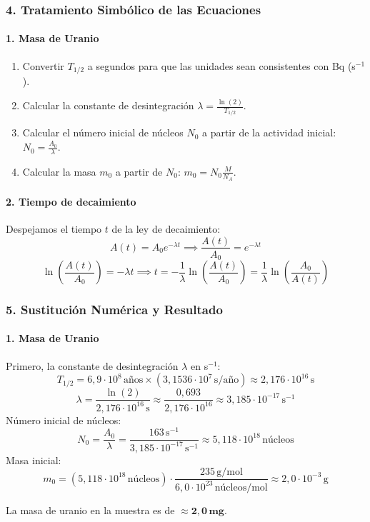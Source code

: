 \subsubsection*{4. Tratamiento Simbólico de las Ecuaciones}
\paragraph{1. Masa de Uranio}
\begin{enumerate}
    \item Convertir $T_{1/2}$ a segundos para que las unidades sean consistentes con Bq (s$^{-1}$).
    \item Calcular la constante de desintegración $\lambda = \frac{\ln(2)}{T_{1/2}}$.
    \item Calcular el número inicial de núcleos $N_0$ a partir de la actividad inicial: $N_0 = \frac{A_0}{\lambda}$.
    \item Calcular la masa $m_0$ a partir de $N_0$: $m_0 = N_0 \frac{M}{N_A}$.
\end{enumerate}

\paragraph{2. Tiempo de decaimiento}
Despejamos el tiempo $t$ de la ley de decaimiento:
$$ A(t) = A_0 e^{-\lambda t} \implies \frac{A(t)}{A_0} = e^{-\lambda t} $$
$$ \ln\left(\frac{A(t)}{A_0}\right) = -\lambda t \implies t = -\frac{1}{\lambda} \ln\left(\frac{A(t)}{A_0}\right) = \frac{1}{\lambda} \ln\left(\frac{A_0}{A(t)}\right) $$

\subsubsection*{5. Sustitución Numérica y Resultado}
\paragraph{1. Masa de Uranio}
Primero, la constante de desintegración $\lambda$ en s$^{-1}$:
$$ T_{1/2} = 6,9 \cdot 10^8 \, \text{años} \times (3,1536 \cdot 10^7 \, \text{s/año}) \approx 2,176 \cdot 10^{16} \, \text{s} $$
$$ \lambda = \frac{\ln(2)}{2,176 \cdot 10^{16} \, \text{s}} \approx \frac{0,693}{2,176 \cdot 10^{16}} \approx 3,185 \cdot 10^{-17} \, \text{s}^{-1} $$
Número inicial de núcleos:
$$ N_0 = \frac{A_0}{\lambda} = \frac{163 \, \text{s}^{-1}}{3,185 \cdot 10^{-17} \, \text{s}^{-1}} \approx 5,118 \cdot 10^{18} \, \text{núcleos} $$
Masa inicial:
$$ m_0 = (5,118 \cdot 10^{18} \, \text{núcleos}) \cdot \frac{235 \, \text{g/mol}}{6,0 \cdot 10^{23} \, \text{núcleos/mol}} \approx 2,0 \cdot 10^{-3} \, \text{g} $$
\begin{cajaresultado}
    La masa de uranio en la muestra es de $\boldsymbol{\approx 2,0 \, \textbf{mg}}$.
\end{cajaresultado}

